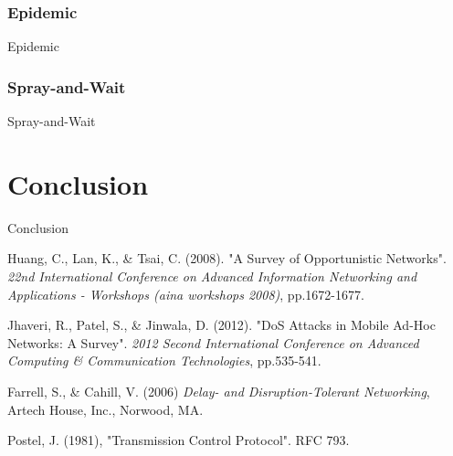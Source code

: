 \documentclass{article}
\begin{document}
\subsubsection{Epidemic}
Epidemic

\subsubsection{Spray-and-Wait}
Spray-and-Wait

\section{Conclusion}
Conclusion

\begin{thebibliography}{20}

Huang, C., Lan, K., \& Tsai, C. (2008). 
"A Survey of Opportunistic Networks". 
\textit{22nd International Conference on Advanced Information Networking and Applications - Workshops (aina workshops 2008)}, pp.1672-1677.

Jhaveri, R., Patel, S., \& Jinwala, D. (2012).
"DoS Attacks in Mobile Ad-Hoc Networks: A Survey".
\textit{2012 Second International Conference on Advanced Computing \& Communication Technologies}, pp.535-541.

Farrell, S., \& Cahill, V. (2006) \textit{Delay- and Disruption-Tolerant Networking}, Artech House, Inc., Norwood, MA.

Postel, J. (1981), "Transmission Control Protocol". RFC 793.


\end{thebibliography}
 
\end{document}
